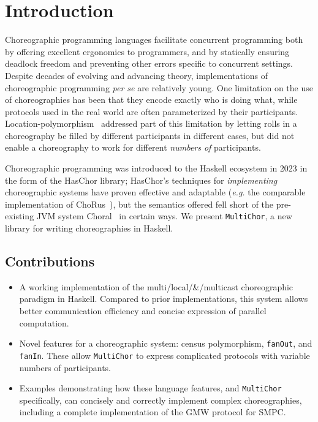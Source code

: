 \documentclass[sigplan,screen,review,anonymous]{acmart}
\newcommand{\HasChor}{Has\-Chor\xspace}
\newcommand{\inlinecode}[2][haskell]{\texttt{#2}}
\newcommand{\MultiChor}{\texttt{Multi\-Chor}\xspace}
\begin{document}
\section{Introduction}\label{sec:introduction}
Choreographic programming languages facilitate concurrent programming
both by offering excellent ergonomics to programmers,
and by statically ensuring deadlock freedom and preventing other errors
specific to concurrent settings.
Despite decades of evolving and advancing theory,
implementations of choreographic programming \textit{per se} are relatively young.
One limitation on the use of choreographies has been that they encode exactly who is doing what,
while protocols used in the real world are often
parameterized by their participants.
Location-polymorphism~\cite{graversen2023polychor} addressed part of this limitation
by letting rolls in a choreography be filled by different participants in different cases,
but did not enable a choreography to work for different \emph{numbers of} participants.

Choreographic programming was introduced to the Haskell ecosystem
in 2023 in the form of the \HasChor library;
\HasChor's techniques for \emph{implementing} choreographic systems have proven effective
and adaptable (\textit{e.g.} the comparable implementation of ChoRus~\cite{chorus}),
but the semantics offered fell short of the pre-existing JVM system Choral~\cite{choral}
in certain ways.
We present \MultiChor, a new library for writing choreographies in Haskell.

\subsection{Contributions}\label{sec:contributions}
\begin{itemize}
    \item A working implementation of the multi\-/local\-/\&\-/multicast choreographic paradigm
    in Haskell.
    Compared to prior implementations, this system allows better communication efficiency
    and concise expression of parallel computation.
    \item Novel features for a choreographic system:
    census polymorphism, \inlinecode{fanOut}, and \inlinecode{fanIn}.
    These allow \MultiChor to express complicated protocols with variable numbers of participants.
    \item Examples demonstrating how these language features, and \MultiChor specifically,
    can concisely and correctly implement complex choreographies,
    including a complete implementation of the GMW protocol for SMPC.
\end{itemize}
\end{document}
